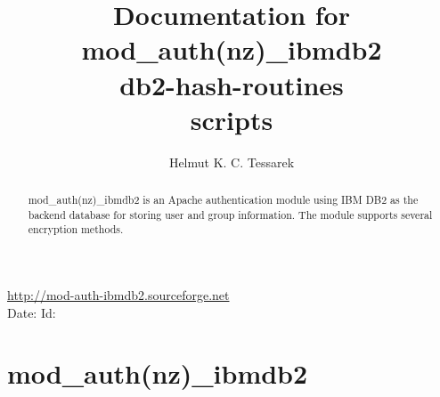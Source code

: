 \documentclass[11pt,letterpaper]{article}
\newcommand{\showtext}[2]{
\ifdata
#1#2
\fi
}
\begin{document}
\author{Helmut K. C. Tessarek}
\title{Documentation for\\
mod\_auth(nz)\_ibmdb2\\
db2-hash-routines\\
scripts}
\date{\longdate{\formatdate{\CommitD{}}{\CommitM{}}{\CommitY{}}}}
\maketitle
\setcounter{page}{0}
\thispagestyle{empty}
\begin{abstract}
mod\_auth(nz)\_ibmdb2 is an Apache authentication module using IBM\textsuperscript{\textregistered}{} DB2\textsuperscript{\textregistered}{} as the backend database for storing user and group information. The module supports several encryption methods.
\end{abstract}

\vfill

\begin{center}
\href{http://mod-auth-ibmdb2.sourceforge.net}{http://mod-auth-ibmdb2.sourceforge.net}\\

{\tiny \rm \showtext{Date: }\CommitDateTimeTz{} }
{\tiny \rm \showtext{Id: }\CommitHashAbbrev{} }

\end{center}
\newpage
\renewcommand{\thepage}{\roman{page}}
\tableofcontents
\newpage
\pagestyle{fancy}
\lhead{}
\rhead{}
\lfoot{{\tiny \rm \showtext{Date: }\CommitDate{}}}
\cfoot{\thepage\ / \pageref*{LastPage}}
\rfoot{{\tiny \rm \showtext{Id: }\CommitHashAbbrev{}}}
\renewcommand{\headrulewidth}{0.4pt}
\renewcommand{\footrulewidth}{0.4pt}
\renewcommand{\thepage}{\arabic{page}}
\setcounter{page}{1}
\section{mod\_auth(nz)\_ibmdb2}
\end{document}
